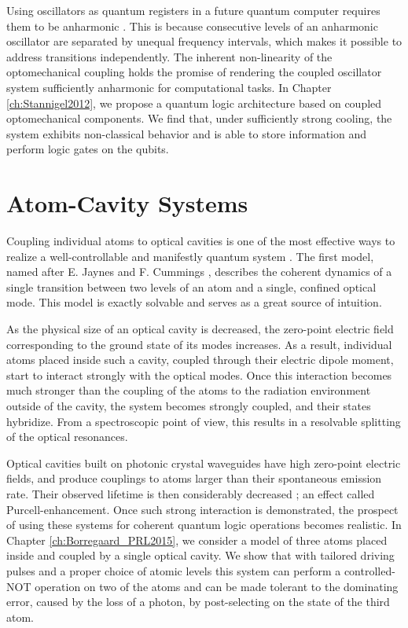 Using oscillators as quantum registers in a future quantum computer requires
them to be anharmonic \cite{Majer2007}. This is because consecutive levels of an
anharmonic oscillator are separated by unequal frequency intervals, which makes
it possible to address transitions independently. The inherent
non-linearity of the optomechanical coupling holds the promise of rendering the
coupled oscillator system sufficiently anharmonic for computational tasks. In
Chapter \ref{ch:Stannigel2012}, we propose a quantum logic architecture based on
coupled optomechanical components. We find that, under sufficiently strong
cooling, the system exhibits non-classical behavior and is able to store
information and perform logic gates on the qubits.






\section{Atom-Cavity Systems}
Coupling individual atoms to optical cavities is one of the most effective ways
to realize a well-controllable and manifestly quantum system \cite{Mabuchi2002,
Walther2006}.
The first model, named after E. Jaynes and F. Cummings \cite{Jaynes1963,
Shore1993}, describes the coherent dynamics of a single transition between two
levels of an atom and a single, confined optical mode. This model is exactly
solvable and serves as a great source of intuition.

As the physical size of an optical cavity is decreased, the zero-point
electric field corresponding to the ground state of its modes increases.
As a result, individual atoms placed inside such a cavity, coupled through their
electric dipole moment, start to interact strongly with the optical modes. Once
this interaction becomes much stronger than the coupling of the atoms to the
radiation environment outside of the cavity, the system becomes strongly coupled, and
their states hybridize. From a spectroscopic point of view, this results in a
resolvable splitting of the optical resonances.

Optical cavities built on photonic crystal waveguides \cite{Tiecke} have
high zero-point electric fields, and produce couplings
to atoms larger than their spontaneous emission rate. Their
observed lifetime is then considerably decreased \cite{Englund2005}; an effect
called Purcell-enhancement.
Once such strong interaction is demonstrated, the prospect of using these
systems for coherent quantum logic operations becomes realistic. In Chapter
\ref{ch:Borregaard_PRL2015}, we consider a model of three atoms placed inside
and coupled by a single optical cavity. We show that with tailored driving pulses
and a proper choice of atomic levels this system can perform a controlled-NOT
operation on two of the atoms and can be made tolerant to the dominating error,
caused by the loss of a photon, by post-selecting on the state of the third
atom.

